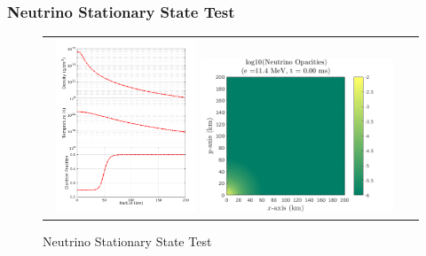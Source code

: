 \subsubsection{Neutrino Stationary State Test}
\begin{figure}[h]
  \centering
  \begin{tabular}{cc}
    \includegraphics[width=0.4\textwidth]{figures/NStatinaryS_EOS}
    \includegraphics[width=0.55\textwidth]{figures/NSS_Opacities}
  \end{tabular}
   \caption{Neutrino Stationary State Test}
\end{figure}


